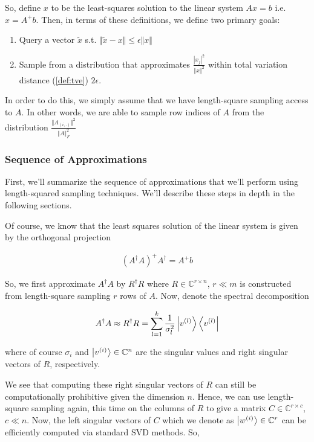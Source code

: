 \documentclass[11pt]{article}
\newcommand\0{\mathbf{0}}
\newcommand\CC{\mathbb{C}}
\newcommand\<{\langle}
\renewcommand\>{\rangle}
\begin{document}
So, define $x$ to be the least-squares solution to the linear system $Ax = b$ i.e. $x = A^+ b$. Then, in terms of these definitions, we define two primary goals:

\begin{enumerate}
\item Query a vector $\tilde{x}$ s.t. $\Vert \tilde{x} - x \Vert \leq \epsilon \Vert x \Vert$
\item Sample from a distribution that approximates $\frac{|x_j|^2}{\Vert x \Vert^2}$ within total variation distance (\autoref{def:tve}) $2\epsilon$.
\end{enumerate}

In order to do this, we simply assume that we have length-square sampling access to $A$. In other words, we are able to sample row indices of $A$ from the distribution $\frac{\Vert A_{(i, \cdot)}\Vert^2}{\Vert A \Vert^2_F}$

\subsubsection{Sequence of Approximations}

First, we'll summarize the sequence of approximations that we'll perform using length-squared sampling techniques. We'll describe these steps in depth in the following sections.

Of course, we know that the least squares solution of the linear system is given by the orthogonal projection

\begin{align*}
	(A^\dag A)^+ A^\dag = A^+ b
\end{align*}

So, we first approximate $A^\dag A$ by $R^\dag R$ where $R \in \CC^{r \times n}$, $r \ll m$ is constructed from length-square sampling $r$ rows of $A$. Now, denote the spectral decomposition 

\begin{align*}
A^\dag A \approx R^\dag R = \sum_{l=1}^k \frac{1}{\sigma_l^2}\ket{v^{(l)}}\bra{v^{(l)}}
\end{align*}

where of course $\sigma_i$ and $\ket{v^{(i)}} \in \CC^n$ are the singular values and right singular vectors of $R$, respectively.

We see that computing these right singular vectors of $R$ can still be computationally prohibitive given the dimension $n$. Hence, we can use length-square sampling again, this time on the columns of $R$ to give a matrix $C \in \CC^{r \times c}$, $c \ll n$. Now, the left singular vectors of $C$ which we denote as $\ket{w^{(i)}} \in \CC^r$ can be efficiently computed via standard SVD methods. So,
\end{document}
